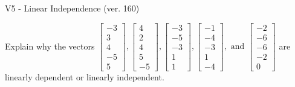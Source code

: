 \begin{exercise}
  \begin{exerciseTitle}V5 - Linear Independence (ver. 160)\end{exerciseTitle}
  \begin{exerciseStatement}
    Explain why the vectors \(\left[\begin{array}{r}
-3 \\
3 \\
4 \\
-5 \\
5
\end{array}\right] , \left[\begin{array}{r}
4 \\
2 \\
4 \\
5 \\
-5
\end{array}\right] , \left[\begin{array}{r}
-3 \\
-5 \\
-3 \\
1 \\
1
\end{array}\right] , \left[\begin{array}{r}
-1 \\
-4 \\
-3 \\
1 \\
-4
\end{array}\right] , \text{ and } \left[\begin{array}{r}
-2 \\
-6 \\
-6 \\
-2 \\
0
\end{array}\right]\) are linearly dependent or linearly independent.	



\end{exerciseStatement}
\end{exercise}
